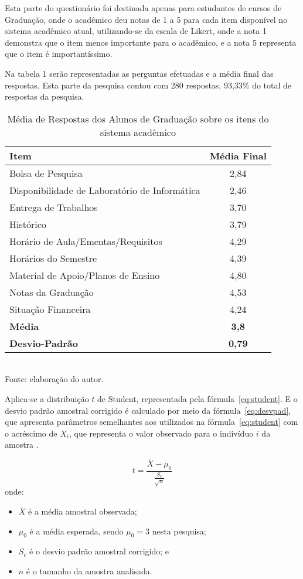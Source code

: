 Esta parte do questionário foi destinada apenas para estudantes de cursos de Graduação, onde o acadêmico deu notas de 1 a 5 para cada item disponível no sistema acadêmico atual, utilizando-se da escala de Likert, onde  a nota 1 demonstra que o item menos importante para o acadêmico, e a nota 5 representa que o item é importantíssimo.

Na tabela 1 serão representadas as perguntas efetuadas e a média final das respostas. Esta parte da pesquisa contou com 280 respostas, 93,33\% do total de respostas da pesquisa.
\begin{table}[!hbt]
\centering
\caption[Média de Respostas dos Alunos de Graduação]{Média de Respostas dos Alunos de Graduação sobre os itens do sistema acadêmico}
\vspace{3mm}
\begin{tabular}{p{9.5cm}|c}\hline
\textbf{Item} & \textbf{Média Final} \\ \hline
Bolsa de Pesquisa & 2,84 \\ \hline
Disponibilidade de Laboratório de Informática & 2,46 \\ \hline
Entrega de Trabalhos & 3,70 \\ \hline
Histórico & 3,79 \\ \hline
Horário de Aula/Ementas/Requisitos & 4,29 \\ \hline
Horários do Semestre & 4,39 \\ \hline
Material de Apoio/Planos de Ensino & 4,80 \\ \hline
Notas da Graduação & 4,53 \\ \hline
Situação Financeira & 4,24 \\ \hline
\textbf{Média} & \textbf{3,8} \\ \hline
\textbf{Desvio-Padrão} & \textbf{0,79} \\ \hline
\end{tabular}
\\ Fonte: elaboração do autor.
\end{table}

Aplica-se a distribuição $t$ de Student, representada pela fórmula~\eqref{eq:student}. E o desvio padrão amostral corrigido é calculado por meio da fórmula~\eqref{eq:desvpad}, que apresenta parâmetros semelhantes aos utilizados na fórmula~\eqref{eq:student} com o acréscimo de $X_i$, que representa o valor observado para o indivíduo $i$ da amostra \cite{DistroStudent}.

\begin{equation} \label{eq:student}
t = \frac{\overline{X} - \mu_0}{\frac{S_c}{\sqrt{n}}}
\end{equation}
onde: 
\begin{itemize}
\item $\overline{X}$ é a média amostral observada;
\item $\mu_0$ é a média esperada, sendo $\mu_0 = 3$ nesta pesquisa;
\item $S_c$ é o desvio padrão amostral corrigido; e
\item $n$ é o tamanho da amostra analisada.
\end{itemize}

